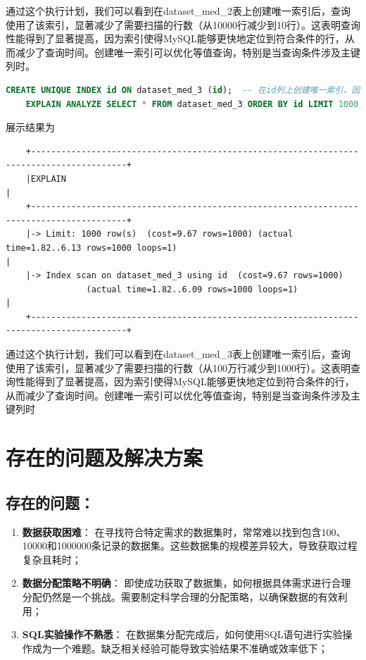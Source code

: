 \documentclass{article}
\begin{document}
	通过这个执行计划，我们可以看到在dataset\_med\_2表上创建唯一索引后，查询使用了该索引，显著减少了需要扫描的行数（从10000行减少到10行）。这表明查询性能得到了显著提高，因为索引使得MySQL能够更快地定位到符合条件的行，从而减少了查询时间。创建唯一索引可以优化等值查询，特别是当查询条件涉及主键列时。
	
	\begin{lstlisting}[language=sql, title=数据集规模1000000，查询大量结果, tabsize=4]
	CREATE UNIQUE INDEX id ON dataset_med_3 (id);  -- 在id列上创建唯一索引，因为id列中的每个值都是唯一的。
	EXPLAIN ANALYZE SELECT * FROM dataset_med_3 ORDER BY id LIMIT 1000;  -- 数据集规模1,000,000，查询大量结果
	\end{lstlisting}
	
	展示结果为
	
	\begin{verbatim}
	+-----------------------------------------------------------------------------------------+
	|EXPLAIN                                                                                  |
	+-----------------------------------------------------------------------------------------+
	|-> Limit: 1000 row(s)  (cost=9.67 rows=1000) (actual time=1.82..6.13 rows=1000 loops=1)                                    |
	|-> Index scan on dataset_med_3 using id  (cost=9.67 rows=1000)
	            (actual time=1.82..6.09 rows=1000 loops=1)                                    |
	+-----------------------------------------------------------------------------------------+
	\end{verbatim}
	
	通过这个执行计划，我们可以看到在dataset\_med\_3表上创建唯一索引后，查询使用了该索引，显著减少了需要扫描的行数（从100万行减少到1000行）。这表明查询性能得到了显著提高，因为索引使得MySQL能够更快地定位到符合条件的行，从而减少了查询时间。创建唯一索引可以优化等值查询，特别是当查询条件涉及主键列时
	
	\section{存在的问题及解决方案}
	
	\subsection{存在的问题：}
	
	\begin{enumerate}[noitemsep, label={{\arabic*})}]
		\item \textbf{数据获取困难}： 在寻找符合特定需求的数据集时，常常难以找到包含100、10000和1000000条记录的数据集。这些数据集的规模差异较大，导致获取过程复杂且耗时；
		\item \textbf{数据分配策略不明确}： 即使成功获取了数据集，如何根据具体需求进行合理分配仍然是一个挑战。需要制定科学合理的分配策略，以确保数据的有效利用；
		\item \textbf{SQL实验操作不熟悉}： 在数据集分配完成后，如何使用SQL语句进行实验操作成为一个难题。缺乏相关经验可能导致实验结果不准确或效率低下；
	\end{enumerate}\textbf{}
	
\end{document}
